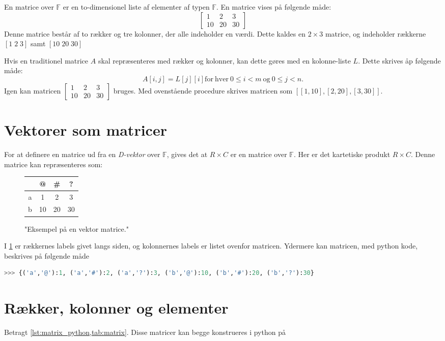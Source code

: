 En matrice over $\mathbb{F}$ er en to-dimensionel liste af elementer af typen $\mathbb{F}$.
En matrice vises på følgende måde:
$$\left[
\begin{matrix}
    1&2&3\\
    10&20&30
\end{matrix}
\right]
$$
Denne matrice består af to rækker og tre kolonner, der alle indeholder en værdi.
Dette kaldes en $2 \times 3$ matrice, og indeholder rækkerne $[1\;2\;3]$ samt $[10\;20\;30]$

Hvis en traditionel matrice $A$ skal repræsenteres med rækker og kolonner, kan dette gøres med en kolonne-liste $L$.
Dette skrives åp følgende måde:
\begin{equation}
    A\left[i,j\right] = L\left[j\right]\left[i\right]\mathrm{for\ hver\ }0\leq i<m\mathrm{\ og\ }0\leq j<n.
\end{equation}
Igen kan matricen $\left[\begin{matrix}1&2&3\\10&20&30\end{matrix}\right]$ bruges.
Med ovenstående procedure skrives matricen som $[[1,10],[2,20],[3,30]]$.

\section{Vektorer som matricer}
For at definere en matrice ud fra en \textit{D-vektor} over $\mathbb{F}$, gives det at $R\times C$ er en matrice over $\mathbb{F}$.
Her er det kartetiske produkt $R\times C$.
Denne matrice kan repræsenteres som:
\begin{figure}[h!]
    \centering
    \begin{tabular}{c|ccc}
        & @ & \# & ?\\\hline
        a&1&2&3\\
        b&10&20&30
    \end{tabular}
    \label{tab:matrix}
    \caption{"Eksempel på en vektor matrice."}
\end{figure}

I \cref{tab:matrix} er rækkernes labels givet langs siden, og kolonnernes labels er listet ovenfor matricen.
Ydermere kan matricen, med python kode, beskrives på følgende måde
\begin{lstlisting}[language=Python,label=lst:matrix_python]
    >>> {('a','@'):1, ('a','#'):2, ('a','?'):3, ('b','@'):10, ('b','#'):20, ('b','?'):30}
\end{lstlisting} 

\section{Rækker, kolonner og elementer}
Betragt \cref{lst:matrix_python,tab:matrix}.
Disse matricer kan begge konstrueres i python på 



